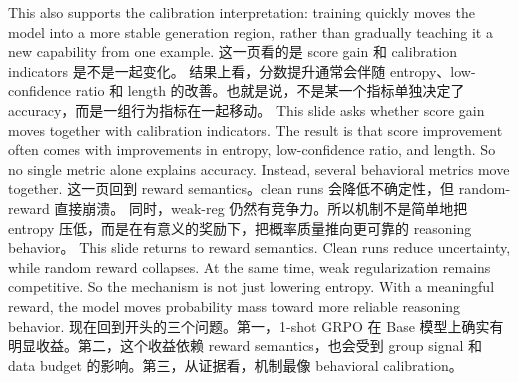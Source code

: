 {}This also supports the calibration interpretation: training quickly moves the model into a more stable generation region, rather than gradually teaching it a new capability from one example.\markdownRendererInterblockSeparator
{}\markdownRendererHorizontalRule{}\markdownRendererInterblockSeparator
{}\markdownRendererInterblockSeparator
{}\markdownRendererInterblockSeparator
{}这一页看的是 score gain 和 calibration indicators 是不是一起变化。\markdownRendererInterblockSeparator
{}结果上看，分数提升通常会伴随 entropy、low-confidence ratio 和 length 的改善。也就是说，不是某一个指标单独决定了 accuracy，而是一组行为指标在一起移动。\markdownRendererInterblockSeparator
{}\markdownRendererInterblockSeparator
{}This slide asks whether score gain moves together with calibration indicators.\markdownRendererInterblockSeparator
{}The result is that score improvement often comes with improvements in entropy, low-confidence ratio, and length. So no single metric alone explains accuracy. Instead, several behavioral metrics move together.\markdownRendererInterblockSeparator
{}\markdownRendererHorizontalRule{}\markdownRendererInterblockSeparator
{}\markdownRendererInterblockSeparator
{}\markdownRendererInterblockSeparator
{}这一页回到 reward semantics。clean runs 会降低不确定性，但 random-reward 直接崩溃。\markdownRendererInterblockSeparator
{}同时，weak-reg 仍然有竞争力。所以机制不是简单地把 entropy 压低，而是在有意义的奖励下，把概率质量推向更可靠的 reasoning behavior。\markdownRendererInterblockSeparator
{}\markdownRendererInterblockSeparator
{}This slide returns to reward semantics. Clean runs reduce uncertainty, while random reward collapses.\markdownRendererInterblockSeparator
{}At the same time, weak regularization remains competitive. So the mechanism is not just lowering entropy. With a meaningful reward, the model moves probability mass toward more reliable reasoning behavior.\markdownRendererInterblockSeparator
{}\markdownRendererHorizontalRule{}\markdownRendererInterblockSeparator
{}\markdownRendererInterblockSeparator
{}\markdownRendererInterblockSeparator
{}现在回到开头的三个问题。第一，1-shot GRPO 在 Base 模型上确实有明显收益。第二，这个收益依赖 reward semantics，也会受到 group signal 和 data budget 的影响。第三，从证据看，机制最像 behavioral calibration。\markdownRendererInterblockSeparator
